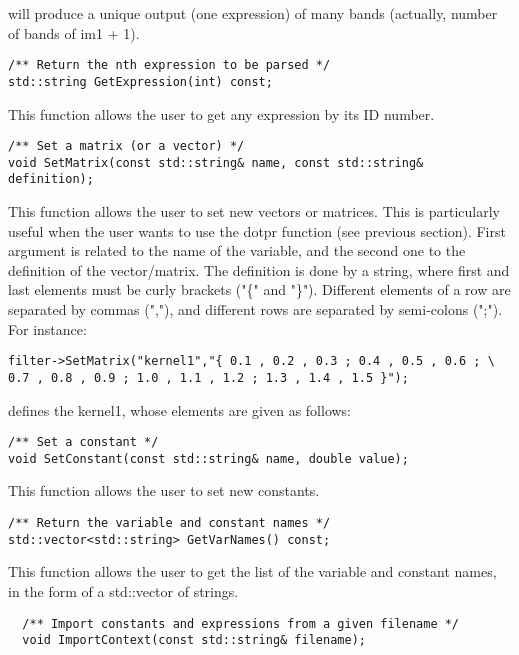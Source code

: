 will produce a unique output (one expression) of many bands (actually, 
number of bands of im1 + 1).

\begin{verbatim}
/** Return the nth expression to be parsed */
std::string GetExpression(int) const;
\end{verbatim}

This function allows the user to get any expression by its ID number.

\begin{verbatim}
/** Set a matrix (or a vector) */
void SetMatrix(const std::string& name, const std::string& definition);
\end{verbatim}

This function allows the user to set new vectors or matrices. This is 
particularly useful when the user wants to use the dotpr function 
(see previous section). First argument is related to the name of the 
variable, and the second one to the definition of the vector/matrix. 
The definition is done by a string, where first and last elements must 
be curly brackets ("\{" and "\}"). Different elements of a row are 
separated by commas (","), and different rows are separated by 
semi-colons (";"). For instance:

\begin{verbatim}
filter->SetMatrix("kernel1","{ 0.1 , 0.2 , 0.3 ; 0.4 , 0.5 , 0.6 ; \
0.7 , 0.8 , 0.9 ; 1.0 , 1.1 , 1.2 ; 1.3 , 1.4 , 1.5 }");
\end{verbatim}

defines the kernel1, whose elements are given as follows:


\begin{verbatim}
/** Set a constant */
void SetConstant(const std::string& name, double value);
\end{verbatim}

This function allows the user to set new constants.

\begin{verbatim}
/** Return the variable and constant names */
std::vector<std::string> GetVarNames() const;
\end{verbatim}

This function allows the user to get the list of the variable and constant names, in the form of a std::vector of strings.

\begin{verbatim}
  /** Import constants and expressions from a given filename */
  void ImportContext(const std::string& filename);
\end{verbatim}

